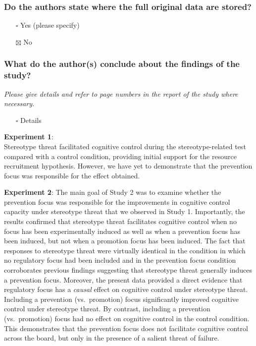 \documentclass[
  doc, a4paper]{apa7}
\providecommand{\tightlist}{%
  \setlength{\itemsep}{0pt}\setlength{\parskip}{0pt}}
\begin{document}
\subsubsection{Do the authors state where the full original data are stored?}\label{do-the-authors-state-where-the-full-original-data-are-stored}

\begin{itemize}
\tightlist
\item[$\square$]
  Yes (please specify)
\item[$\boxtimes$]
  No
\end{itemize}

\subsubsection{What do the author(s) conclude about the findings of the study?}\label{what-do-the-authors-conclude-about-the-findings-of-the-study}

\emph{Please give details and refer to page numbers in the report of the study where necessary.}

\begin{itemize}
\tightlist
\item[$\square$]
  Details
\end{itemize}

\textbf{Experiment 1}:\\
Stereotype threat facilitated cognitive control during the stereotype-related test compared with a control condition, providing initial support for the resource recruitment hypothesis. However, we have yet to demonstrate that the prevention focus was responsible for the effect obtained.

\textbf{Experiment 2}:
The main goal of Study 2 was to examine whether the prevention focus was responsible for the improvements in cognitive control capacity under stereotype threat that we observed in Study 1. Importantly, the results confirmed that stereotype threat facilitates cognitive control when no focus has been experimentally induced as well as when a prevention focus has been induced, but not when a promotion focus has been induced. The fact that responses to stereotype threat were virtually identical in the condition in which no regulatory focus had been included and in the prevention focus condition corroborates previous findings suggesting that stereotype threat generally induces a prevention focus. Moreover, the present data provided a direct evidence that regulatory focus has a \emph{causal} effect on cognitive control under stereotype threat. Including a prevention (vs.~promotion) focus significantly improved cognitive control under stereotype threat. By contrast, including a prevention (vs.~promotion) focus had no effect on cognitive control in the control condition. This demonstrates that the prevention focus does not facilitate cognitive control across the board, but only in the presence of a salient threat of failure.
\end{document}
